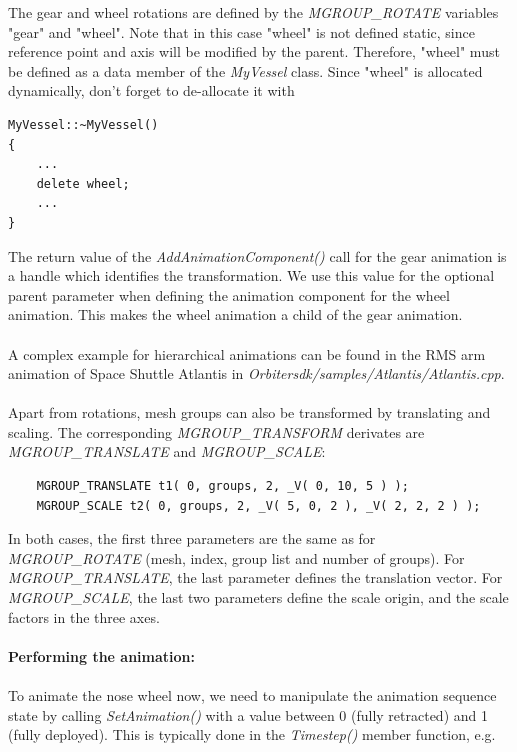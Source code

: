 \documentclass[Orbiter Developer Manual.tex]{subfiles}
\begin{document}
\noindent
The gear and wheel rotations are defined by the \textit{MGROUP\_ROTATE} variables "gear" and "wheel". Note that in this case "wheel" is not defined static, since reference point and axis will be modified by the parent. Therefore, "wheel" must be defined as a data member of the \textit{MyVessel} class. Since "wheel" is allocated dynamically, don't forget to de-allocate it with

\begin{lstlisting}
MyVessel::~MyVessel()
{
	...
	delete wheel;
	...
}
\end{lstlisting}

\noindent
The return value of the \textit{AddAnimationComponent()} call for the gear animation is a handle which identifies the transformation. We use this value for the optional parent parameter when defining the animation component for the wheel animation. This makes the wheel animation a child of the gear animation.\\
\\
A complex example for hierarchical animations can be found in the RMS arm animation of Space Shuttle Atlantis in \textit{Orbitersdk/samples/Atlantis/Atlantis.cpp}.\\
\\
Apart from rotations, mesh groups can also be transformed by translating and scaling. The corresponding \textit{MGROUP\_TRANSFORM} derivates are \textit{MGROUP\_TRANSLATE} and \textit{MGROUP\_SCALE}:

\begin{lstlisting}
	MGROUP_TRANSLATE t1( 0, groups, 2, _V( 0, 10, 5 ) );
	MGROUP_SCALE t2( 0, groups, 2, _V( 5, 0, 2 ), _V( 2, 2, 2 ) );
\end{lstlisting}

\noindent
In both cases, the first three parameters are the same as for \textit{MGROUP\_ROTATE} (mesh, index, group list and number of groups). For \textit{MGROUP\_TRANSLATE}, the last parameter defines the translation vector. For \textit{MGROUP\_SCALE}, the last two parameters define the scale origin, and the scale factors in the three axes.\\
\\
\textbf{Performing the animation:}\\
\\
To animate the nose wheel now, we need to manipulate the animation sequence state by calling \textit{SetAnimation()} with a value between 0 (fully retracted) and 1 (fully deployed). This is typically done in the \textit{Timestep()} member function, e.g.
\end{document}
